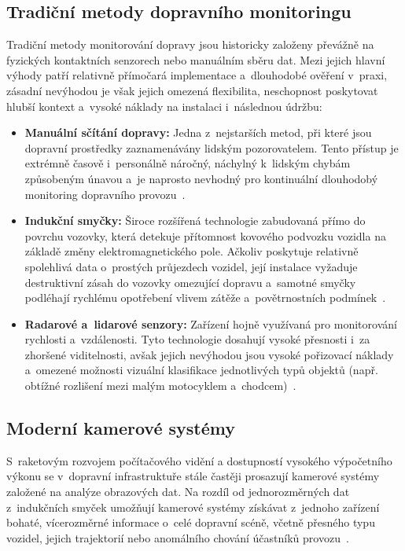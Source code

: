 \subsection{Tradiční metody dopravního monitoringu}
Tradiční metody monitorování dopravy jsou historicky založeny převážně na fyzických kontaktních senzorech nebo manuálním sběru dat. Mezi jejich hlavní výhody patří relativně přímočará implementace a~dlouhodobé ověření v~praxi, zásadní nevýhodou je však jejich omezená flexibilita, neschopnost poskytovat hlubší kontext a~vysoké náklady na instalaci i~následnou údržbu:
\begin{itemize}
    \item \textbf{Manuální sčítání dopravy:} Jedna z~nejstarších metod, při které jsou dopravní prostředky zaznamenávány lidským pozorovatelem. Tento přístup je extrémně časově i~personálně náročný, náchylný k~lidským chybám způsobeným únavou a~je naprosto nevhodný pro kontinuální dlouhodobý monitoring dopravního provozu~\cite{zhou_traffic_survey_2024}.
    \item \textbf{Indukční smyčky:} Široce rozšířená technologie zabudovaná přímo do povrchu vozovky, která detekuje přítomnost kovového podvozku vozidla na základě změny elektromagnetického pole. Ačkoliv poskytuje relativně spolehlivá data o~prostých průjezdech vozidel, její instalace vyžaduje destruktivní zásah do vozovky omezující dopravu a~samotné smyčky podléhají rychlému opotřebení vlivem zátěže a~povětrnostních podmínek~\cite{zhou_traffic_survey_2024}.
    \item \textbf{Radarové a~lidarové senzory:} Zařízení hojně využívaná pro monitorování rychlosti a~vzdálenosti. Tyto technologie dosahují vysoké přesnosti i~za zhoršené viditelnosti, avšak jejich nevýhodou jsou vysoké pořizovací náklady a~omezené možnosti vizuální klasifikace jednotlivých typů objektů (např. obtížné rozlišení mezi malým motocyklem a~chodcem)~\cite{zhou_traffic_survey_2024}.
\end{itemize}

\subsection{Moderní kamerové systémy}
S~raketovým rozvojem počítačového vidění a dostupností vysokého výpočetního výkonu se v~dopravní infrastruktuře stále častěji prosazují kamerové systémy založené na analýze obrazových dat. Na rozdíl od jednorozměrných dat z~indukčních smyček umožňují kamerové systémy získávat z~jednoho zařízení bohaté, vícerozměrné informace o~celé dopravní scéně, včetně přesného typu vozidel, jejich trajektorií nebo anomálního chování účastníků provozu~\cite{szeliski_computer_vision}.

